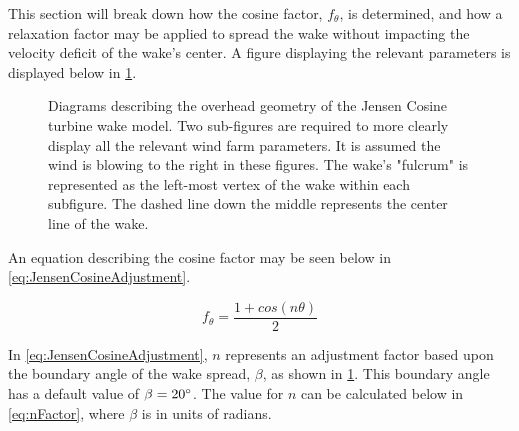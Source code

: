 \documentclass[a4paper]{jpconf}
\begin{document}
This section will break down how the cosine factor, $f_\theta$, is determined, and how a relaxation factor may be applied to spread the wake without impacting the velocity deficit of the wake's center. A figure displaying the relevant parameters is displayed below in \cref{fig:JensenDiagrams}.

\begin{figure}[h]
    \centering
    \caption{Diagrams describing the overhead geometry of the Jensen Cosine turbine wake model. Two sub-figures are required to more clearly display all the relevant wind farm parameters. It is assumed the wind is blowing to the right in these figures. The wake's "fulcrum" is represented as the left-most vertex of the wake within each subfigure. The dashed line down the middle represents the center line of the wake.}
    \label{fig:JensenDiagrams}
\end{figure}

An equation describing the cosine factor may be seen below in \cref{eq:JensenCosineAdjustment}.

\begin{equation}
    f_\theta = \frac{1 + cos(n\theta)}{2}
    \label{eq:JensenCosineAdjustment}
\end{equation}

In \cref{eq:JensenCosineAdjustment}, $n$ represents an adjustment factor based upon the boundary angle of the wake spread, $\beta$, as shown in \cref{fig:JensenDiagrams}. This boundary angle has a default value of $\beta = 20 \degree$. The value for $n$ can be calculated below in \cref{eq:nFactor}, where $\beta$ is in units of radians.
\end{document}
